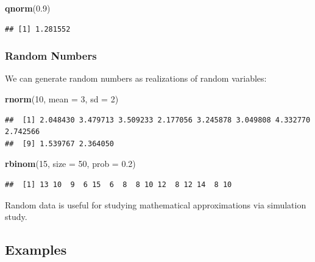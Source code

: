 \documentclass[
]{article}
\newenvironment{Shaded}{\begin{snugshade}}{\end{snugshade}}
\newcommand{\AttributeTok}[1]{\textcolor[rgb]{0.13,0.29,0.53}{#1}}
\newcommand{\DecValTok}[1]{\textcolor[rgb]{0.00,0.00,0.81}{#1}}
\newcommand{\FloatTok}[1]{\textcolor[rgb]{0.00,0.00,0.81}{#1}}
\newcommand{\FunctionTok}[1]{\textcolor[rgb]{0.13,0.29,0.53}{\textbf{#1}}}
\newcommand{\NormalTok}[1]{#1}
\begin{document}
\begin{Shaded}
\begin{Highlighting}[]
\FunctionTok{qnorm}\NormalTok{(}\FloatTok{0.9}\NormalTok{)}
\end{Highlighting}
\end{Shaded}

\begin{verbatim}
## [1] 1.281552
\end{verbatim}

\hypertarget{random-numbers}{%
\subsubsection{Random Numbers}\label{random-numbers}}

We can generate random numbers as realizations of random variables:

\begin{Shaded}
\begin{Highlighting}[]
\FunctionTok{rnorm}\NormalTok{(}\DecValTok{10}\NormalTok{, }\AttributeTok{mean =} \DecValTok{3}\NormalTok{, }\AttributeTok{sd =} \DecValTok{2}\NormalTok{)}
\end{Highlighting}
\end{Shaded}

\begin{verbatim}
##  [1] 2.048430 3.479713 3.509233 2.177056 3.245878 3.049808 4.332770 2.742566
##  [9] 1.539767 2.364050
\end{verbatim}

\begin{Shaded}
\begin{Highlighting}[]
\FunctionTok{rbinom}\NormalTok{(}\DecValTok{15}\NormalTok{, }\AttributeTok{size =} \DecValTok{50}\NormalTok{, }\AttributeTok{prob =} \FloatTok{0.2}\NormalTok{)}
\end{Highlighting}
\end{Shaded}

\begin{verbatim}
##  [1] 13 10  9  6 15  6  8  8 10 12  8 12 14  8 10
\end{verbatim}

Random data is useful for studying mathematical approximations via
simulation study.

\hypertarget{examples}{%
\subsection{Examples}\label{examples}}
\end{document}

